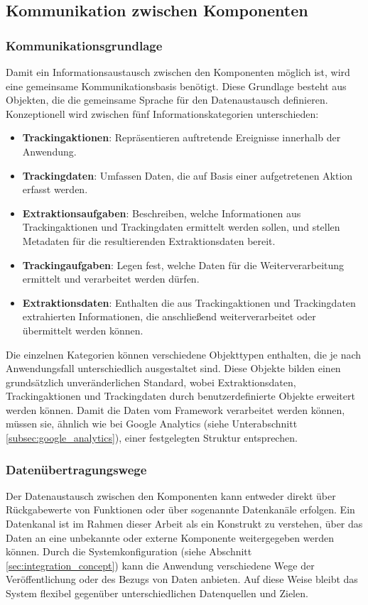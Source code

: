 \subsection{Kommunikation zwischen Komponenten}
\label{subsec:communication_between_coponents}

\subsubsection{Kommunikationsgrundlage}
Damit ein Informationsaustausch zwischen den Komponenten möglich ist, wird eine gemeinsame Kommunikationsbasis benötigt. Diese Grundlage besteht aus Objekten, die die gemeinsame Sprache für den Datenaustausch definieren.  
Konzeptionell wird zwischen fünf Informationskategorien unterschieden:

\begin{itemize}
    \item \textbf{Trackingaktionen}: Repräsentieren auftretende Ereignisse innerhalb der Anwendung.
    \item \textbf{Trackingdaten}: Umfassen Daten, die auf Basis einer aufgetretenen Aktion erfasst werden.
    \item \textbf{Extraktionsaufgaben}: Beschreiben, welche Informationen aus Trackingaktionen und Trackingdaten ermittelt werden sollen, und stellen Metadaten für die resultierenden Extraktionsdaten bereit.
    \item \textbf{Trackingaufgaben}: Legen fest, welche Daten für die Weiterverarbeitung ermittelt und verarbeitet werden dürfen.
    \item \textbf{Extraktionsdaten}: Enthalten die aus Trackingaktionen und Trackingdaten extrahierten Informationen, die anschließend weiterverarbeitet oder übermittelt werden können.
\end{itemize}

Die einzelnen Kategorien können verschiedene Objekttypen enthalten, die je nach Anwendungsfall unterschiedlich ausgestaltet sind. Diese Objekte bilden einen grundsätzlich unveränderlichen Standard, wobei Extraktionsdaten, Trackingaktionen und Trackingdaten durch benutzerdefinierte Objekte erweitert werden können. Damit die Daten vom Framework verarbeitet werden können, müssen sie, ähnlich wie bei Google Analytics (siehe Unterabschnitt \ref{subsec:google_analytics}), einer festgelegten Struktur entsprechen.

\subsubsection{Datenübertragungswege}
Der Datenaustausch zwischen den Komponenten kann entweder direkt über Rückgabewerte von Funktionen oder über sogenannte Datenkanäle erfolgen.  
Ein Datenkanal ist im Rahmen dieser Arbeit als ein Konstrukt zu verstehen, über das Daten an eine unbekannte oder externe Komponente weitergegeben werden können.  
Durch die Systemkonfiguration (siehe Abschnitt \ref{sec:integration_concept}) kann die Anwendung verschiedene Wege der Veröffentlichung oder des Bezugs von Daten anbieten. Auf diese Weise bleibt das System flexibel gegenüber unterschiedlichen Datenquellen und Zielen.

